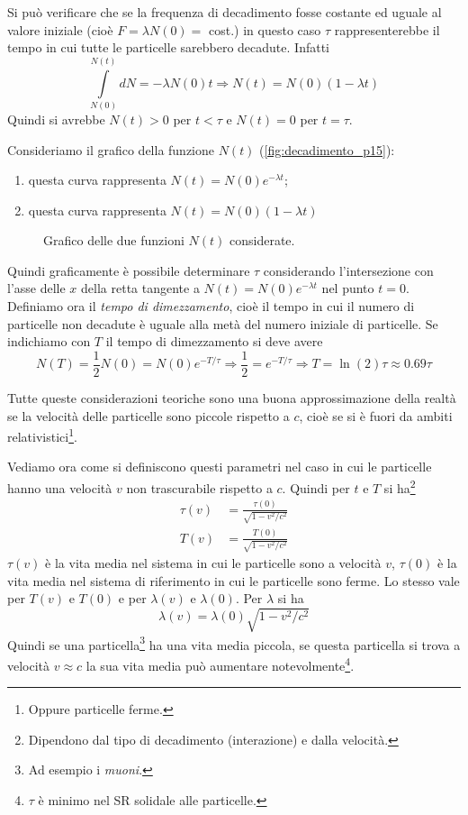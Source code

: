 Si può verificare che se la frequenza di decadimento fosse costante ed uguale 
al
valore iniziale (cioè $F = \lambda N(0)=$ cost.) in questo caso $\tau$
rappresenterebbe il tempo in cui tutte le particelle sarebbero decadute. Infatti
\[
\int\limits^{N(t)}_{N(0)}dN = -\lambda N(0)t\Rightarrow N(t) = N(0)(1-\lambda t)
\]
Quindi si avrebbe $N(t) > 0$ per $t<\tau$ e $N(t) = 0$ per $t=\tau$.

Consideriamo il grafico della funzione $N(t)$ (\autoref{fig:decadimento_p15}):
\begin{enumerate}
 \item questa curva rappresenta $N(t) = N(0)e^{-\lambda t}$;
 \item questa curva rappresenta $N(t) = N(0)(1-\lambda t)$
\end{enumerate}
\begin{figure}[htbp]
\centering
\caption{Grafico delle due funzioni $N(t)$ considerate.}
\label{fig:decadimento_p15}

\end{figure}
Quindi graficamente è possibile determinare $\tau$ considerando l'intersezione
con l'asse delle $x$ della retta tangente a $N(t) = N(0)e^{-\lambda t}$ nel
punto $t=0$. Definiamo ora il \textit{tempo di
dimezzamento}, cioè il tempo in cui il numero di particelle non decadute è
uguale alla metà del numero iniziale di particelle. Se indichiamo con $T$ il
tempo di dimezzamento si deve avere
\begin{equation}
 N(T) = \frac{1}{2}N(0) = N(0)e^{- T/\tau} \Rightarrow \frac{1}{2} = 
e^{-T/\tau} \Rightarrow T = \ln(2)\tau\approx 0.69\tau
\end{equation}

Tutte queste considerazioni teoriche sono una buona approssimazione della 
realtà
se la velocità delle particelle sono piccole rispetto a $c$, cioè se si è 
fuori
da ambiti relativistici\footnote{Oppure particelle ferme.}.

Vediamo ora come si definiscono questi parametri nel caso in cui le particelle
hanno una velocità $v$ non trascurabile rispetto a $c$. Quindi per $t$ e $T$ si
ha\footnote{Dipendono dal tipo di decadimento (interazione) e dalla velocità.}
\begin{align}
 \tau(v) &= \frac{\tau(0)}{\sqrt{1-v^2/c^2}}\\
 T(v) &= \frac{T(0)}{\sqrt{1-v^2/c^2}}
\end{align}
$\tau(v)$ è la vita media nel sistema in cui le particelle sono a velocità 
$v$,
$\tau(0)$ è la vita media nel sistema di riferimento in cui le particelle sono
ferme. Lo stesso vale per $T(v)$ e $T(0)$ e per $\lambda(v)$ e $\lambda(0)$. Per
$\lambda$ si ha
\begin{equation}
 \lambda(v) = \lambda(0)\sqrt{1-v^2/c^2}
\end{equation}
Quindi se una particella\footnote{Ad esempio i \textit{muoni}. } ha una vita
media piccola, se questa particella si trova a velocità $v\approx c$ la sua 
vita
media può aumentare notevolmente\footnote{$\tau$ è minimo nel \textsc{SR}
solidale alle particelle. }.

